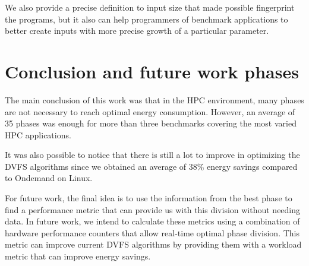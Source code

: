 We also provide a precise definition to input size that made possible fingerprint the programs, but it also can help programmers of benchmark applications to better create inputs with more precise growth of a particular parameter.

%

\section{Conclusion and future work phases} \label{sec:conclusion}
The main conclusion of this work was that in the HPC environment, many phases are not necessary to reach optimal energy consumption. However, an average of 35 phases was enough for more than three benchmarks covering the most varied HPC applications.

It was also possible to notice that there is still a lot to improve in optimizing the DVFS algorithms since we obtained an average of 38\% energy savings compared to Ondemand on Linux.

For future work, the final idea is to use the information from the best phase to find a performance metric that can provide us with this division without needing data. In future work, we intend to calculate these metrics using a combination of hardware performance counters that allow real-time optimal phase division. This metric can improve current DVFS algorithms by providing them with a workload metric that can improve energy savings.
